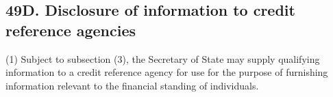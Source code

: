 \documentclass[12pt,a4paper]{article}
\begin{document}
%
%
%
%
%
%
%
%
%
%
%

\subsection{49D. Disclosure of information to credit reference agencies}

(1) Subject to subsection (3), the 
Secretary of State  %
may supply qualifying information to a credit reference agency for use for the purpose of furnishing information relevant to the financial standing of individuals.
\end{document}
